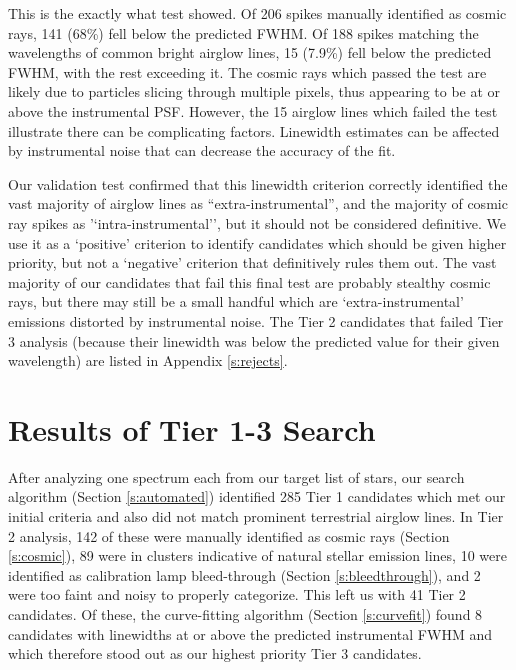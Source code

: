 \documentclass[twocolumn]{aastex701}
\begin{document}
This is the exactly what test showed.  Of 206 spikes manually identified as cosmic rays, 141 (68\%) fell below the predicted FWHM.  Of 188 spikes matching the wavelengths of common bright airglow lines, 15 (7.9\%) fell below the predicted FWHM, with the rest exceeding it. The cosmic rays which passed the test are likely due to particles slicing through multiple pixels, thus appearing to be at or above the instrumental PSF. However, the 15 airglow lines which failed the test illustrate there can be complicating factors. Linewidth estimates can be affected by instrumental noise that can decrease the accuracy of the fit. 

Our validation test confirmed that this linewidth criterion correctly identified the vast majority of airglow lines as ``extra-instrumental'', and the majority of cosmic ray spikes as '`intra-instrumental'', but it should not be considered definitive.  We use it as a `positive' criterion to identify candidates which should be given higher priority, but not a `negative' criterion that definitively rules them out.  The vast majority of our candidates that fail this final test are probably stealthy cosmic rays, but there may still be a small handful which are `extra-instrumental' emissions distorted by instrumental noise. The Tier 2 candidates that failed Tier 3 analysis (because their linewidth was below the predicted value for their given wavelength) are listed in Appendix \ref{s:rejects}.

\section{Results of Tier 1-3 Search}
\label{s:results}
After analyzing one spectrum each from our target list of stars, our search algorithm (Section \ref{s:automated}) identified 285 Tier 1 candidates which met our initial criteria and also did not match prominent terrestrial airglow lines. In Tier 2 analysis, 142 of these were manually identified as cosmic rays (Section \ref{s:cosmic}), 89 were in clusters indicative of natural stellar emission lines,  10 were identified as calibration lamp bleed-through (Section \ref{s:bleedthrough}), and 2 were too faint and noisy to properly categorize. This left us with 41 Tier 2 candidates. Of these, the curve-fitting algorithm (Section \ref{s:curvefit}) found 8 candidates with linewidths at or above the predicted instrumental FWHM and which therefore stood out as our highest priority Tier 3 candidates. 
\end{document}
